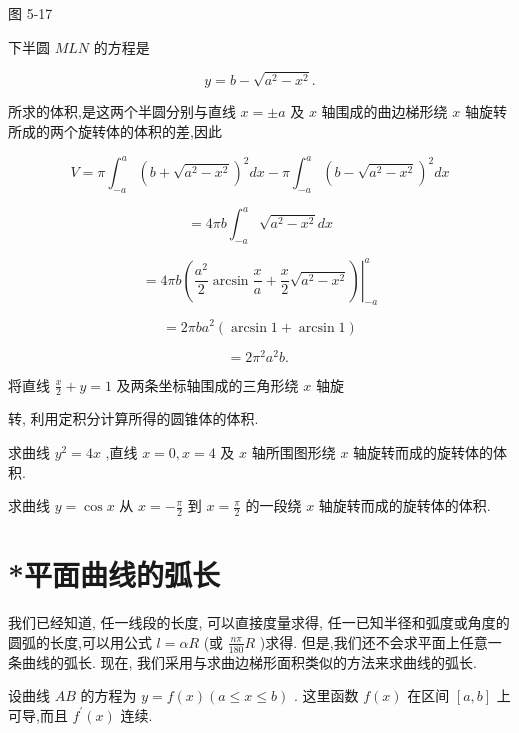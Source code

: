 \documentclass[lang=cn,newtx,10pt,scheme=chinese]{elegantbook}
\begin{document}
图 5-17

下半圆 \({MLN}\) 的方程是

\[
y = b - \sqrt{{a}^{2} - {x}^{2}}.
\]

所求的体积,是这两个半圆分别与直线 \(x = \pm a\) 及 \(x\) 轴围成的曲边梯形绕 \(x\) 轴旋转所成的两个旋转体的体积的差,因此

\[
V = \pi {\int }_{-a}^{a}{\left( b + \sqrt{{a}^{2} - {x}^{2}}\right) }^{2}{dx} - \pi {\int }_{-a}^{a}{\left( b - \sqrt{{a}^{2} - {x}^{2}}\right) }^{2}{dx}
\]

\[
= {4\pi b}{\int }_{-a}^{a}\sqrt{{a}^{2} - {x}^{2}}{dx}
\]

\[
= {\left. 4\pi b\left( \frac{{a}^{2}}{2}\arcsin \frac{x}{a} + \frac{x}{2}\sqrt{{a}^{2} - {x}^{2}}\right) \right| }_{-a}^{a}
\]

\[
= {2\pi b}{a}^{2}\left( {\arcsin 1 + \arcsin 1}\right)
\]

\[
= 2{\pi }^{2}{a}^{2}b\text{. }
\]

\begin{problemset}[练习]

\item 将直线 \(\frac{x}{2} + y = 1\) 及两条坐标轴围成的三角形绕 \(x\) 轴旋

转, 利用定积分计算所得的圆锥体的体积.

\item 求曲线 \({y}^{2} = {4x}\) ,直线 \(x = 0,x = 4\) 及 \(x\) 轴所围图形绕 \(x\) 轴旋转而成的旋转体的体积.

\item 求曲线 \(y = \cos x\) 从 \(x = - \frac{\pi }{2}\) 到 \(x = \frac{\pi }{2}\) 的一段绕 \(x\) 轴旋转而成的旋转体的体积.

\end{problemset}

\section{*平面曲线的弧长}

我们已经知道, 任一线段的长度, 可以直接度量求得, 任一已知半径和弧度或角度的圆弧的长度,可以用公式 \(l = {\alpha R}\) (或 \(\frac{n\pi }{180}R\) )求得. 但是,我们还不会求平面上任意一条曲线的弧长. 现在, 我们采用与求曲边梯形面积类似的方法来求曲线的弧长.

设曲线 \({AB}\) 的方程为 \(y = f\left( x\right) \left( {a \leq x \leq b}\right)\) . 这里函数 \(f\left( x\right)\) 在区间 \(\left\lbrack {a,b}\right\rbrack\) 上可导,而且 \({f}^{\prime }\left( x\right)\) 连续.
\end{document}
